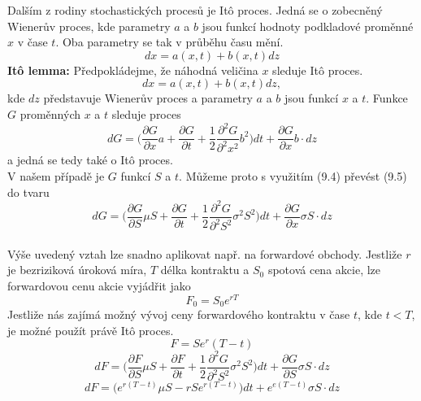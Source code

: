 \documentclass[a4paper]{book}
\begin{document}
Dalším z rodiny stochastických procesů je It\^o proces. Jedná se o zobecněný Wienerův proces, kde
parametry $a$ a $b$ jsou funkcí hodnoty podkladové proměnné $x$ v čase $t$. Oba parametry se tak v průběhu času mění.
\begin{equation*}
d x = a(x,t) + b(x,t)d z
\end{equation*}
\textbf{It\^o lemma:} Předpokládejme, že náhodná veličina $x$ sleduje It\^o proces.
\begin{equation*}
d x = a(x,t)+b(x,t)d z,
\end{equation*} 
kde $d z$ představuje Wienerův proces a parametry $a$ a $b$ jsou funkcí $x$ a $t$. Funkce $G$ proměnných $x$ a $t$ sleduje proces
\begin{equation}
d G = \bigg( \frac{\partial G}{\partial x}a + \frac{\partial G}{\partial t} + \frac{1}{2} \frac{\partial^2 G}{\partial^2 x^2}b^2 \bigg) d t + \frac{\partial G}{\partial x}b \cdot d z
\end{equation}
a jedná se tedy také o It\^o proces.\\

V našem případě je $G$ funkcí $S$ a $t$. Můžeme proto s využitím (9.4) převést (9.5) do tvaru
\begin{equation*}
d G = \bigg( \frac{\partial G}{\partial S}\mu S + \frac{\partial G}{\partial t} + \frac{1}{2} \frac{\partial^2 G}{\partial^2 S^2}\sigma^2 S^2 \bigg) d t + \frac{\partial G}{\partial x}\sigma S \cdot d z
\end{equation*}\\

Výše uvedený vztah lze snadno aplikovat např. na forwardové obchody. Jestliže $r$ je bezriziková úroková míra, $T$ délka kontraktu a $S_0$ spotová cena akcie, lze forwardovou cenu akcie vyjádřit jako
\begin{equation*}
F_0 = S_0 e^{rT}
\end{equation*} 
Jestliže nás zajímá možný vývoj ceny forwardového kontraktu v čase $t$, kde $t < T$, je možné použít právě It\^o proces.
\begin{equation*}
F=Se^r(T-t)
\end{equation*} 
\begin{equation*}
d F = \bigg( \frac{\partial F}{\partial S}\mu S + \frac{\partial F}{\partial t} + \frac{1}{2}\frac{\partial^2 G}{\partial^2 S^2}\sigma^2 S^2 \bigg) d t + \frac{\partial G}{\partial S}\sigma S \cdot dz
\end{equation*}
\begin{equation*}
d F = \big(e^{r(T-t)}\mu S - rSe^{r(T-t)} \big) dt + e^{e(T-t)}\sigma S \cdot dz
\end{equation*}
\end{document}
